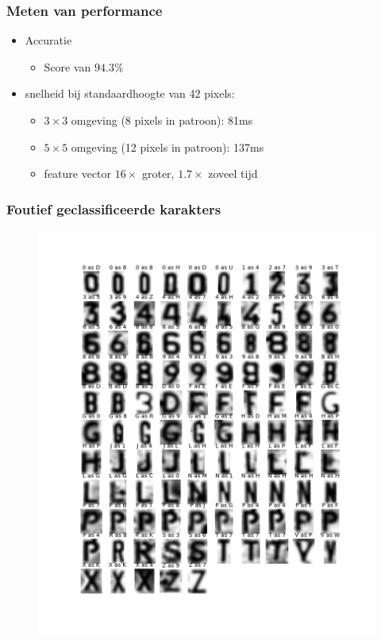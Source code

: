 \documentclass{beamer}
\begin{document}
    \begin{frame}
        \frametitle{Meten van performance}

        \begin{itemize}
            \item Accuratie
            \begin{itemize}
                \item Score van $94.3\%$
            \end{itemize}
            \item snelheid bij standaardhoogte van 42 pixels:
            \begin{itemize}
                \item $3 \times 3$ omgeving (8 pixels in patroon): 81ms
                \item $5 \times 5$ omgeving (12 pixels in patroon): 137ms
                \item feature vector $16\times$ groter, $1.7\times$ zoveel tijd
            \end{itemize}
        \end{itemize}
    \end{frame}

    \begin{frame}
        \frametitle{Foutief geclassificeerde karakters}

        \begin{figure}
            \includegraphics[scale=.2]{faulty.png}
        \end{figure}
    \end{frame}
\end{document}

